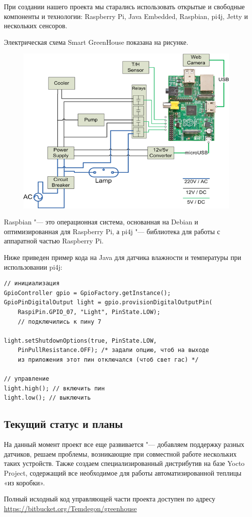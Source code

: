 \documentclass[10pt, a5paper]{article}
\begin{document}
При создании нашего проекта мы старались использовать открытые и свободные компоненты и технологии: Raspberry Pi, Java Embedded, Raspbian, pi4j, Jetty и нескольких сенсоров.

Электрическая схема Smart GreenHouse показана на рисунке.

\begin{figure}[h!]
  \centering
  \includegraphics[scale=0.8]{13_2014_1.png}
\end{figure}

Raspbian "--- это операционная система, основанная на Debian и оптимизированная для Raspberry Pi, а pi4j "--- библиотека для работы с аппаратной частью Raspberry Pi.

Ниже приведен пример кода на Java для датчика влажности и температуры при использовании pi4j:

\begin{verbatim}
// инициализация
GpioController gpio = GpioFactory.getInstance();
GpioPinDigitalOutput light = gpio.provisionDigitalOutputPin(
	RaspiPin.GPIO_07, "Light", PinState.LOW); 
	// подключились к пину 7
	
light.setShutdownOptions(true, PinState.LOW, 
	PinPullResistance.OFF); /* задали опцию, чтоб на выходе 
	из приложения этот пин отключался (чтоб свет гас) */

// управление
light.high(); // включить пин
light.low(); // выключить
\end{verbatim}
\subsection*{Текущий статус и планы}

На данный момент проект все еще развивается "--- добавляем поддержку разных датчиков, решаем проблемы, возникающие при совместной работе нескольких таких устройств. 
Также создаем специализированный дистрибутив на базе Yocto Project, содержащий все необходимое для работы автоматизированной теплицы «из коробки».

Полный исходный код управляющей части проекта доступен по адресу \url{https://bitbucket.org/Temdegon/greenhouse}
\end{document}
